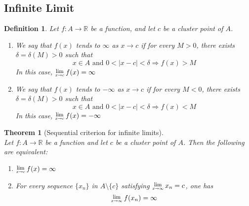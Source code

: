 \documentclass[8pt]{article}
\newcommand{\Lim}[1]{\raisebox{0.5ex}{\scalebox{0.8}{$\displaystyle \lim_{#1}\;$}}}
\newtheorem{definition}{Definition}[section]
\newtheorem{theorem}{Theorem}[section]
\theoremstyle{definition}
\begin{document}
\subsection{Infinite Limit}
\begin{definition}\normalfont Let $f:A\to\mathbb{R}$ be a function, and let $c$ be a cluster point of $A$.
\begin{enumerate}
\item We say that $f(x)$ tends to $\infty$ as $x\to c$ if for every $M>0$, there exists $\delta=\delta(M)>0$ such that
\[
x\in A\text{ and }0<|x-c|<\delta \Rightarrow f(x)>M
\]
In this case, $\Lim{x\to c}f(x)=\infty$
\item We say that $f(x)$ tends to $-\infty$ as $x\to c$ if for every $M<0$, there exists $\delta=\delta(M)>0$ such that
\[
x\in A\text{ and }0<|x-c|<\delta \Rightarrow f(x)<M
\]
In this case, $\Lim{x\to c}f(x)=-\infty$
\end{enumerate}
\end{definition}
\begin{theorem}[Sequential criterion for infinite limits]
\hfill\\\normalfont Let $f:A\to \mathbb{R}$ be a function and let $c$ be a cluster point of $A$. Then the following are equivalent:
\begin{enumerate}
\item $\Lim{x\to c}f(x)=\infty$
\item For every sequence $\{x_n\}$ in $A\setminus\{c\}$ satisfying $\Lim{x\to \infty}x_n=c$, one has
\[
\Lim{x\to \infty}f(x_n)=\infty
\]
\end{enumerate}
\end{theorem}
\end{document}
